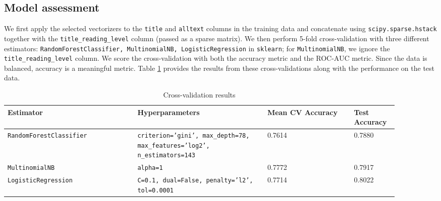 \documentclass{amsart}
\theoremstyle{definition}
\theoremstyle{remark}
\begin{document}
\subsection{Model assessment}

We first apply the selected vectorizers to the \texttt{title} and \texttt{alltext} columns in the training data and concatenate using \texttt{scipy.sparse.hstack} together with the \texttt{title\_reading\_level} column (passed as a sparse matrix). We then perform 5-fold cross-validation with three different estimators: \texttt{RandomForestClassifier, MultinomialNB, LogisticRegression} in \texttt{sklearn}; for \texttt{MultinomialNB}, we ignore the \texttt{title\_reading\_level} column. We score the cross-validation with both the accuracy metric and the ROC-AUC metric.  Since the data is balanced, accuracy is a meaningful metric.  Table \ref{cv} provides the results from these cross-validations along with the performance on the test data.

\begin{table}
\caption{Cross-validation results}\label{cv}
\begin{tabular}{|p{0.3\linewidth}|p{0.3\linewidth}|p{0.2\linewidth}|p{0.1\linewidth}|}
\hline
Estimator & Hyperparameters & Mean CV Accuracy & Test Accuracy\\
\hline
\texttt{RandomForestClassifier} & \texttt{criterion='gini', max\_depth=78, max\_features='log2', n\_estimators=143} & 0.7614 & 0.7880\\
\hline
\texttt{MultinomialNB} & \texttt{alpha=1} & 0.7772 &0.7917 \\
\hline
\texttt{LogisticRegression} & \texttt{C=0.1, dual=False, penalty='l2', tol=0.0001} & 0.7714 & 0.8022\\
\hline
\end{tabular}
\end{table}
\end{document}
